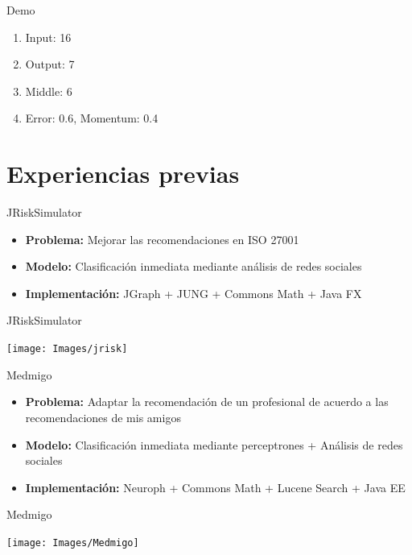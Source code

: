 \documentclass{beamer}
\begin{document}
\begin{frame}{Demo}
\begin{enumerate}
	\item Input: 16
	\item Output: 7
	\item Middle: 6
	\item Error: 0.6, Momentum: 0.4
\end{enumerate}
\end{frame}

\section{Experiencias previas}

\begin{frame}{JRiskSimulator}
    \begin{itemize}
        \item \textbf{Problema:} Mejorar las recomendaciones en ISO 27001
        \item \textbf{Modelo: } Clasificación inmediata mediante análisis de redes sociales
        \item \textbf{Implementación: }  JGraph + JUNG + Commons Math + Java FX
    \end{itemize}
\end{frame}

\begin{frame}{JRiskSimulator}
    \begin{center}
        \texttt{[image: Images/jrisk]}
    \end{center}
\end{frame}

\begin{frame}{Medmigo}
    \begin{itemize}
        \item \textbf{Problema:} Adaptar la recomendación de un profesional de acuerdo a las recomendaciones de mis amigos
        \item \textbf{Modelo: } Clasificación inmediata mediante perceptrones + Análisis de redes sociales
        \item \textbf{Implementación: } Neuroph + Commons Math + Lucene Search + Java EE 
    \end{itemize}
\end{frame}

\begin{frame}{Medmigo}
    \begin{center}
        \texttt{[image: Images/Medmigo]}
    \end{center}
\end{frame}
\end{document}
